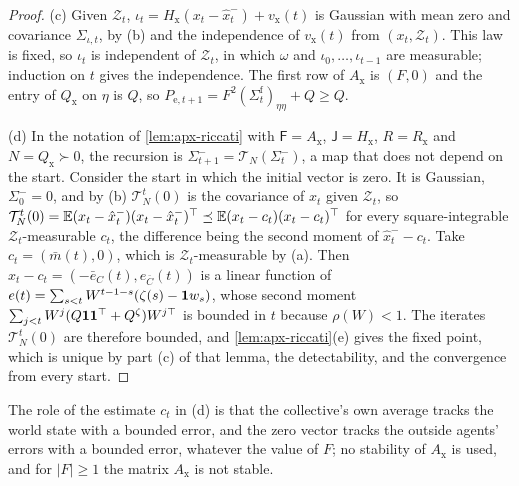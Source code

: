 \begin{proof}
(c) Given $\mathcal Z_t$, $\iota_t=H_{\mathrm x}(x_t-\hat x^-_t)+v_{\mathrm x}(t)$ is Gaussian with mean zero and covariance $\Sigma_{\iota,t}$, by (b) and the independence of $v_{\mathrm x}(t)$ from $(x_t,\mathcal Z_t)$. This law is fixed, so $\iota_t$ is independent of $\mathcal Z_t$, in which $\omega$ and $\iota_0,\dots,\iota_{t-1}$ are measurable; induction on $t$ gives the independence. The first row of $A_{\mathrm x}$ is $(F,0)$ and the entry of $Q_{\mathrm x}$ on $\eta$ is $Q$, so $P_{\mathrm e,t+1}=F^2(\Sigma^{\mathrm f}_t)_{\eta\eta}+Q\ge Q$.

(d) In the notation of \cref{lem:apx-riccati} with $\mathsf F=A_{\mathrm x}$, $\mathsf J=H_{\mathrm x}$, $R=R_{\mathrm x}$ and $N=Q_{\mathrm x}\succ0$, the recursion is $\Sigma^-_{t+1}=\mathcal T_N(\Sigma^-_t)$, a map that does not depend on the start. Consider the start in which the initial vector is zero. It is Gaussian, $\Sigma^-_0=0$, and by (b) $\mathcal T_N^t(0)$ is the covariance of $x_t$ given $\mathcal Z_t$, so $\mathcal T_N^t(0)=\mathbb{E}(x_t-\hat x^-_t)(x_t-\hat x^-_t)^\top\preceq\mathbb{E}(x_t-c_t)(x_t-c_t)^\top$ for every square-integrable $\mathcal Z_t$-measurable $c_t$, the difference being the second moment of $\hat x^-_t-c_t$. Take $c_t=(\bar m(t),0)$, which is $\mathcal Z_t$-measurable by (a). Then $x_t-c_t=(-\bar e_C(t),e_{\bar C}(t))$ is a linear function of $e(t)=\sum_{s<t}W^{t-1-s}(\zeta(s)-\mathbf{1} w_s)$, whose second moment $\sum_{j<t}W^j(Q\mathbf{1}\mathbf{1}^\top+Q^\zeta)W^{j\top}$ is bounded in $t$ because $\rho(W)<1$. The iterates $\mathcal T_N^t(0)$ are therefore bounded, and \cref{lem:apx-riccati}(e) gives the fixed point, which is unique by part (c) of that lemma, the detectability, and the convergence from every start.
\end{proof}

The role of the estimate $c_t$ in (d) is that the collective's own average tracks the world state with a bounded error, and the zero vector tracks the outside agents' errors with a bounded error, whatever the value of $F$; no stability of $A_{\mathrm x}$ is used, and for $\lvert F\rvert\ge1$ the matrix $A_{\mathrm x}$ is not stable.

